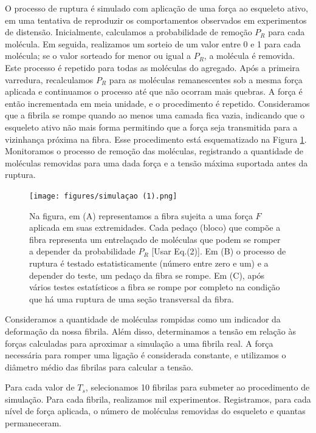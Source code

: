 \documentclass[11pt,a4paper]{article} %
\begin{document}
    O processo de ruptura é simulado com aplicação de uma força ao esqueleto ativo, em uma tentativa de reproduzir os comportamentos observados  
    em experimentos de distensão. Inicialmente, calculamos a probabilidade de remoção \(P_{R}\) para cada molécula. Em seguida, realizamos um  
    sorteio de um valor entre 0 e 1 para cada molécula; se o valor sorteado for menor ou igual a \(P_{R}\), a molécula é removida. Este processo  
    é repetido para todas as moléculas do agregado. Após a primeira varredura, recalculamos \(P_{R}\) para as moléculas remanescentes sob a mesma  
    força aplicada e continuamos o processo até que não ocorram mais quebras. A força é então incrementada em meia unidade, e o procedimento é  
    repetido. Consideramos que a fibrila se rompe quando ao menos uma camada fica vazia, indicando que o esqueleto ativo não mais forma permitindo  
    que a força seja transmitida para a vizinhança próxima na fibra. Esse procedimento está esquematizado na Figura \ref{M4}. Monitoramos o  
    processo de remoção das moléculas, registrando a quantidade de moléculas removidas para uma dada força e a tensão máxima suportada antes da  
    ruptura.  


    \begin{figure}[H] 

        \centering 
        \texttt{[image: figures/simulaçao (1).png]} 
        \caption{Na figura, em (A) representamos a fibra sujeita a uma força $F$ aplicada em suas extremidades. Cada pedaço (bloco) que compõe  
        a fibra representa um entrelaçado de moléculas que podem se romper a depender da probabilidade $P_{R}$ [Usar Eq.(2)]. Em (B) o processo  
        de ruptura é testado estatisticamente (número entre zero e um) e a depender do teste, um pedaço da fibra se rompe. Em (C), após vários  
        testes estatísticos a fibra se rompe por completo na condição que há uma ruptura de uma seção transversal da fibra.}  
        \label{M4} 

    \end{figure} 


    Consideramos a quantidade de moléculas rompidas como um indicador da deformação da nossa fibrila. Além disso, determinamos a tensão em relação  
    às forças calculadas para aproximar a simulação a uma fibrila real. A força necessária para romper uma ligação é considerada constante, e  
    utilizamos o diâmetro médio das fibrilas para calcular a tensão.  

    Para cada valor de \(T_{s}\), selecionamos 10 fibrilas para submeter ao procedimento de simulação. Para cada fibrila, realizamos mil  
    experimentos. Registramos, para cada nível de força aplicada, o número de moléculas removidas do esqueleto e quantas permaneceram.  
\end{document}
